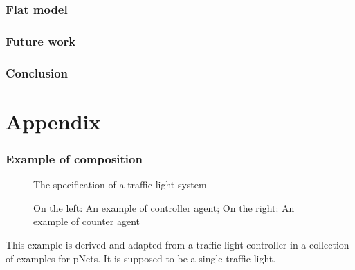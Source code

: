 \documentclass{article}
\begin{document}

\section{Flat model}

\section{Future work}

\section{Conclusion}


\pagebreak



\pagebreak
\appendix
\part*{Appendix}

\section{Example of composition}\label{apx:composition}
\begin{figure}[h]
\centering

\caption{The specification of a traffic light system}
\label{fig:tls}
\end{figure}
\begin{figure}
\centering

\vrule

\caption{On the left: An example of controller agent; On the right: An example of counter agent}
\label{fig:tlh}
\end{figure}
This example is derived and adapted from a traffic light controller in a collection of examples for pNets.
It is supposed to be a single traffic light.
\end{document}
